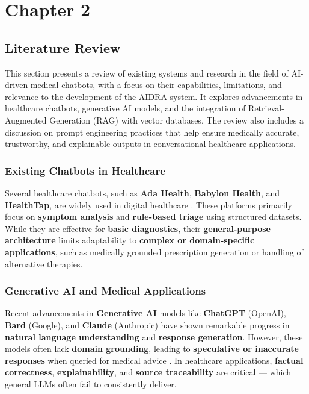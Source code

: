 \documentclass[12pt,a4paper]{report}
\newcommand{\titleKey}{AIDRA}
\begin{document}
	{\vfill \chapter*{\centering \vfill Chapter 2 \vfill}\vfill}
	\thispagestyle{empty}
	\newpage
\section{Literature Review}
\label{Literature Review}

This section presents a review of existing systems and research in the field of AI-driven medical chatbots, with a focus on their capabilities, limitations, and relevance to the development of the \titleKey{} system. It explores advancements in healthcare chatbots, generative AI models, and the integration of Retrieval-Augmented Generation (RAG) with vector databases. The review also includes a discussion on prompt engineering practices that help ensure medically accurate, trustworthy, and explainable outputs in conversational healthcare applications.

\subsection{Existing Chatbots in Healthcare}
\label{subsec:existing-chatbots}

Several healthcare chatbots, such as \textbf{Ada Health}, \textbf{Babylon Health}, and \textbf{HealthTap}, are widely used in digital healthcare \cite{digital_health_platforms}. These platforms primarily focus on \textbf{symptom analysis} and \textbf{rule-based triage} using structured datasets. While they are effective for \textbf{basic diagnostics}, their \textbf{general-purpose architecture} limits adaptability to \textbf{complex or domain-specific applications}, such as medically grounded prescription generation or handling of alternative therapies.

\subsection{Generative AI and Medical Applications}
\label{subsec:generative-ai-medical}

Recent advancements in \textbf{Generative AI} models like \textbf{ChatGPT} (OpenAI), \textbf{Bard} (Google), and \textbf{Claude} (Anthropic) have shown remarkable progress in \textbf{natural language understanding} and \textbf{response generation}. However, these models often lack \textbf{domain grounding}, leading to \textbf{speculative or inaccurate responses} when queried for medical advice \cite{chatgpt, hallucination_survey}. In healthcare applications, \textbf{factual correctness}, \textbf{explainability}, and \textbf{source traceability} are critical — which general LLMs often fail to consistently deliver.
\end{document}
